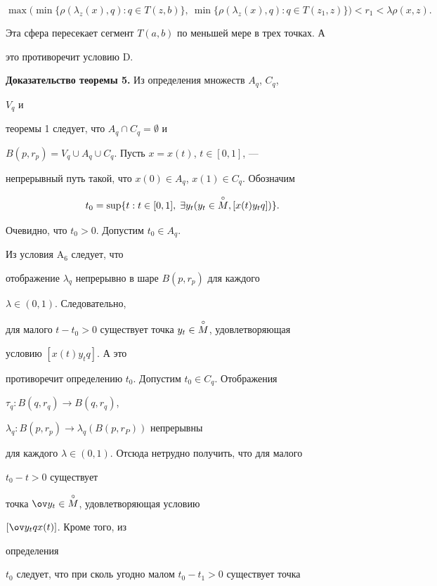 $$


\max\bigl(\min\{\rho(\lambda_z(x),q):q\in T(z,b)\}, \ 


\min\{\rho(\lambda_z(x),q):q\in T(z_1,z)\}\bigr)< 


r_1<\lambda\rho(x,z). 


$$


Эта сфера пересекает сегмент $T(a,b)$ по меньшей мере в трех точках. А 


это противоречит условию D. 


\medskip 


 


{\bf Доказательство теоремы 5.} Из определения множеств $A_q$, $C_q$, 


$V_q$ и 


теоремы 1 следует, что $A_q\cap C_q=\emptyset$ и 


$B(p,r_p)=V_q\cup A_q\cup C_q$. Пусть $x=x(t)$, $t\in[0,1]$, --- 


непрерывный путь такой, что $x(0)\in A_q$, $x(1)\in C_q$. Обозначим 


$$ 


t_0=\sup\{t:t\in[0,1],\;\exists y_t(y_t\in\cM, 


[x(t)y_t q])\}. 


$$ 


Очевидно, что $t_0>0$. Допустим $t_0\in A_q$. 


Из условия A${}_6$ следует, что 


отображение $\lambda_q$ непрерывно в шаре $B(p,r_p)$ для каждого 


$\lambda\in(0,1)$. Следовательно, 


для малого $t-t_0>0$ существует точка $y_t\in\overset{\circ}{M}{}$, удовлетворяющая 


условию $[x(t)y_t q]$. А это 


противоречит определению $t_0$. Допустим $t_0\in C_q$. Отображения 


$\tau_q:B(q,r_q)\to B(q,r_q)$, 


$\lambda_q:B(p,r_p)\to\lambda_q(B(p,r_P))$ непрерывны 


для каждого $\lambda\in(0,1)$. Отсюда нетрудно получить, что для малого 


$t_0-t>0$ существует 


точка $\ov y_t\in\cM$, удовлетворяющая условию 


$[\ov y_t q x(t)]$. Кроме того, из 


определения 


$t_0$ следует, что при сколь угодно малом $t_0-t_1>0$ существует точка 


